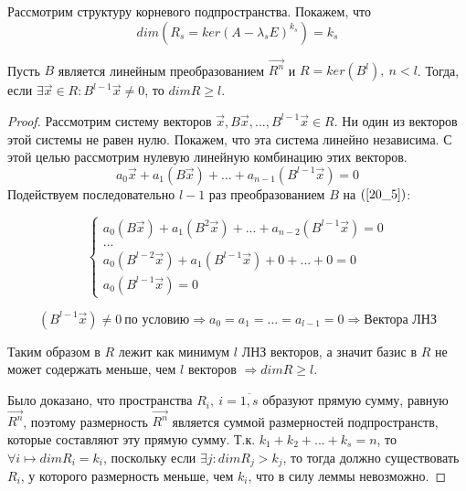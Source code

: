 \documentclass[a4paper, 12pt]{article}
\begin{document}
Рассмотрим структуру корневого подпространства. Покажем, что 
\[dim(R_s = ker(A - \lambda_s E)^{k_s}) = k_s\]

\begin{lemma}
Пусть $B$ является линейным преобразованием $\vec{R^n}$ и $R = ker(B^l),~ n < l$. Тогда, если $\exists \vec{x} \in R: B^{l-1} \vec{x} \neq 0$, то $dim R \geq l$.
\begin{proof}
Рассмотрим систему векторов $\vec{x}, B\vec{x}, ..., B^{l-1} \vec{x} \in R$. Ни один из векторов этой системы не равен нулю. Покажем, что эта система линейно независима. С этой целью рассмотрим нулевую линейную комбинацию этих векторов.
\begin{equation}
a_0 \vec{x} + a_1(B \vec{x}) + ... + a_{n-1}(B^{l-1} \vec{x}) = 0
\label{20_5}
\end{equation}
Подействуем последовательно $l - 1$ раз преобразованием $B$ на $(\ref{20_5})$:

\begin{equation*}
\begin{cases}
   a_0(B \vec{x}) + a_1 (B^2 \vec{x}) + ... + a_{n-2}(B^{l-1} \vec{x}) = 0 \\
   ... \\
   a_0(B^{l-2} \vec{x}) + a_1(B^{l-1} \vec{x}) + 0 + ... + 0 = 0 \\
   a_0 (B^{l-1} \vec{x}) = 0
\end{cases}
\end{equation*}

\[(B^{l-1} \vec{x}) \neq 0 ~\text{по условию} \Rightarrow a_0 = a_1 = ... = a_{l-1} = 0 \Rightarrow \text{Вектора ЛНЗ}\]

Таким образом в $R$ лежит как минимум $l$ ЛНЗ векторов, а значит базис в $R$ не может содержать меньше, чем $l$ векторов $\Rightarrow dim R \geq l$.

Было доказано, что пространства $R_i,~ i = \overline{1,s}$ образуют прямую сумму, равную $\vec{R^n}$, поэтому размерность $\vec{R^n}$ является суммой размерностей подпространств, которые составляют эту прямую сумму. Т.к. $k_1 + k_2 + ... + k_s = n$, то $\forall i \longmapsto dim R_i = k_i$, поскольку если $\exists j: dim R_j > k_j$, то тогда должно существовать $R_i$, у которого размерность меньше, чем $k_i$, что в силу леммы невозможно.
\end{proof}
\end{lemma}
\end{document}
